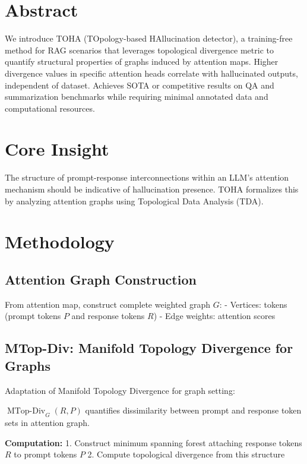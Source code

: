 
\section{Abstract}
We introduce TOHA (TOpology-based HAllucination detector), a training-free method for RAG scenarios that leverages topological divergence metric to quantify structural properties of graphs induced by attention maps. Higher divergence values in specific attention heads correlate with hallucinated outputs, independent of dataset. Achieves SOTA or competitive results on QA and summarization benchmarks while requiring minimal annotated data and computational resources.

\section{Core Insight}
The structure of prompt-response interconnections within an LLM's attention mechanism should be indicative of hallucination presence. TOHA formalizes this by analyzing attention graphs using Topological Data Analysis (TDA).

\section{Methodology}

\subsection{Attention Graph Construction}
From attention map, construct complete weighted graph $G$:
- Vertices: tokens (prompt tokens $P$ and response tokens $R$)
- Edge weights: attention scores

\subsection{MTop-Div: Manifold Topology Divergence for Graphs}
Adaptation of Manifold Topology Divergence for graph setting:

$\operatorname{MTop-Div}_G(R, P)$ quantifies dissimilarity between prompt and response token sets in attention graph.

\textbf{Computation:}
1. Construct minimum spanning forest attaching response tokens $R$ to prompt tokens $P$
2. Compute topological divergence from this structure

